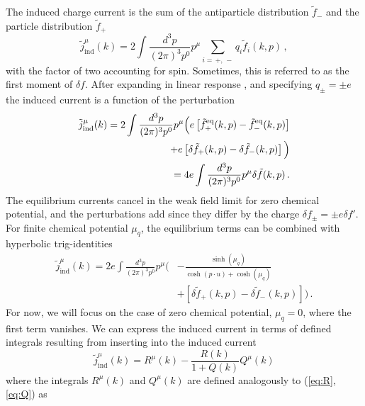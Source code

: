 The induced charge current is the sum of the antiparticle distribution $\widetilde{f}_-$ and the particle distribution $\widetilde{f}_+$
\begin{equation}\label{eq:perturbation1}
\tilde{j}_{\mathrm{ind}}^\mu(k) = 2\int \frac{d^3 p}{(2 \pi)^3 p^0}p^\mu 
\sum_{i = \, +, \, -} q_i \tilde{f}_{i}(k,p)\,,
\end{equation}
with the factor of two accounting for spin. Sometimes, this is referred to as the first moment of $\delta f$.
After expanding in linear response , and specifying $q_\pm = \pm e$ the induced current is a function of the perturbation
\begin{align}\label{eq:perturbation2}
\tilde{j}_{\mathrm{ind}}^\mu(k) = 2\int \frac{d^3 p}{(2 \pi)^3 p^0}p^\mu \Big( e \left[\tilde{f}^{\mathrm{eq}}_+(k,p)-\tilde{f}^{\mathrm{eq}}_-(k,p)\right]\notag\\
+ e\left[\delta\tilde{f}_+(k,p)-\delta\tilde{f}_-(k,p)\right]
\Big)
\notag\\
=4 e\int \frac{d^3 p}{(2 \pi)^3 p^0}p^\mu \delta\tilde{f}(k,p)
\,.
\end{align}
The equilibrium currents cancel in the weak field limit for zero chemical potential, and the perturbations add since they differ by the charge $\delta f_\pm=\pm e \delta f' $. For finite chemical potential $\mu_q$, the equilibrium terms can be combined with hyperbolic trig-identities
\begin{equation}
\begin{split}
\tilde{j}_{\mathrm{ind}}^\mu(k) 
=2 e\int \frac{d^3 p}{(2 \pi)^3 p^0}p^\mu \Big(&-\frac{\sinh{(\mu_q)}}{\cosh{(p \cdot u)}+\cosh{(\mu_q)}} \\&+  \left[\delta\tilde{f}_+(k,p)-\delta\tilde{f}_-(k,p)\right]
 \Big)
\,.
\end{split}
\end{equation}
For now, we will focus on the case of zero chemical potential, $\mu_q=0$, where the first term vanishes.
We can express the induced current in terms of defined integrals \cite{Formanek:2021blc} resulting from inserting  into the induced current
\begin{equation}\label{eq:jmu}
\widetilde{j}_{\mathrm{ind}}^\mu(k) = R^\mu(k) - \frac{R(k)}{1+Q(k)} Q^\mu(k)
\end{equation}
where the integrals $R^\mu(k)$ and $Q^\mu(k)$ are defined analogously to (\ref{eq:R},\ref{eq:Q}) as
